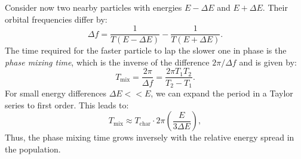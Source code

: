         Consider now two nearby particles with energies $E - \Delta E$ and $ E + \Delta E $. Their orbital frequencies differ by:
        \begin{equation}
            \Delta f = \frac{1}{T( E - \Delta E)} - \frac{1}{T(E + \Delta E)}.
        \end{equation}
        The time required for the faster particle to lap the slower one in phase is the \textit{phase mixing time}, which is the inverse of the difference $2\pi / \Delta f$ and is given by:
        \begin{equation}
            T_\mathrm{mix} = \frac{2\pi}{\Delta f} = \frac{2\pi T_1 T_2}{T_2 - T_1}.
        \end{equation}
        For small energy differences \( \Delta E << E \), we can expand the period in a Taylor series to first order. This leads to:
        \begin{equation}
            T_\mathrm{mix} \approx T_\mathrm{char} \cdot 2\pi \left( \frac{E}{3 \Delta E} \right),
            \label{EQ:phase_mixing}
        \end{equation}
        Thus, the phase mixing time grows inversely with the relative energy spread in the population.
